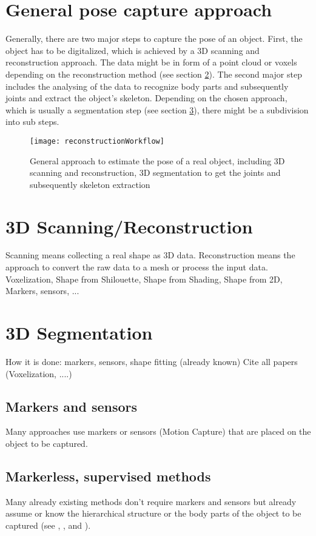 \section{General pose capture approach}
Generally, there are two major steps to capture the pose of an object. First, the object has to be digitalized, which is achieved by a 3D scanning and reconstruction approach. The data might be in form of a point cloud or voxels depending on the reconstruction method (see section \ref{sec:reconstruction}). The second major step includes the analysing of the data to recognize body parts and subsequently joints and extract the object's skeleton. Depending on the chosen approach, which is usually a segmentation step (see section \ref{sec:segmentation}), there might be a subdivision into sub steps.
%
%
\begin{figure}
	\centering
	\texttt{[image: reconstructionWorkflow]}
	\caption{General approach to estimate the pose of a real object, including 3D scanning and reconstruction, 3D segmentation to get the joints and subsequently skeleton extraction}
	\label{fig:posecapture}
\end{figure}
%
\section{3D Scanning/Reconstruction}
\label{sec:reconstruction}
%
%
Scanning means collecting a real shape as 3D data. Reconstruction means the approach to convert the raw data to a mesh or process the input data.
Voxelization, Shape from Shilouette, Shape from Shading, Shape from 2D, Markers, sensors, ... 

\section{3D Segmentation}
\label{sec:segmentation}
%
%
How it is done: markers, sensors, shape fitting (already known)
Cite all papers (Voxelization, ....)

\subsection{Markers and sensors}
Many approaches use markers or sensors (Motion Capture) that are placed on the object to be captured. 

\subsection{Markerless, supervised methods}
Many already existing methods don't require markers and sensors but already assume or know the hierarchical structure or the body parts of the object to be captured (see \cite{multiLayerSkeleton}, \cite{baker2005shape}, \cite{de2008hierarchical} and \cite{michoud2007real}).

